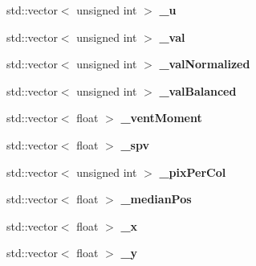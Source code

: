 \begin{DoxyCompactItemize}
\item 
std\+::vector$<$ unsigned int $>$ {\bfseries \+\_\+u}\hypertarget{classLaserData_ab27a18a599b0251dd2ba9654f7939965}{}\label{classLaserData_ab27a18a599b0251dd2ba9654f7939965}

\item 
std\+::vector$<$ unsigned int $>$ {\bfseries \+\_\+val}\hypertarget{classLaserData_ac709774b5b4618312b1400741efb0a1e}{}\label{classLaserData_ac709774b5b4618312b1400741efb0a1e}

\item 
std\+::vector$<$ unsigned int $>$ {\bfseries \+\_\+val\+Normalized}\hypertarget{classLaserData_ae80a6438d10d5f8330b0d9db65bc1f1d}{}\label{classLaserData_ae80a6438d10d5f8330b0d9db65bc1f1d}

\item 
std\+::vector$<$ unsigned int $>$ {\bfseries \+\_\+val\+Balanced}\hypertarget{classLaserData_aafea372e8ff8722dcd21c096047227a9}{}\label{classLaserData_aafea372e8ff8722dcd21c096047227a9}

\item 
std\+::vector$<$ float $>$ {\bfseries \+\_\+vent\+Moment}\hypertarget{classLaserData_a53b20ce99f11333b8a5d73dd5bd0b42e}{}\label{classLaserData_a53b20ce99f11333b8a5d73dd5bd0b42e}

\item 
std\+::vector$<$ float $>$ {\bfseries \+\_\+spv}\hypertarget{classLaserData_abdfa0a1645730ba76e4c2ee308ef4e6e}{}\label{classLaserData_abdfa0a1645730ba76e4c2ee308ef4e6e}

\item 
std\+::vector$<$ unsigned int $>$ {\bfseries \+\_\+pix\+Per\+Col}\hypertarget{classLaserData_aba7ca84cc24a7243498e948c615f3a9e}{}\label{classLaserData_aba7ca84cc24a7243498e948c615f3a9e}

\item 
std\+::vector$<$ float $>$ {\bfseries \+\_\+median\+Pos}\hypertarget{classLaserData_a62be581db140ce0db62e45da39b0d1b1}{}\label{classLaserData_a62be581db140ce0db62e45da39b0d1b1}

\item 
std\+::vector$<$ float $>$ {\bfseries \+\_\+x}\hypertarget{classLaserData_a3311c9d2df2169356639fc64b1ac4670}{}\label{classLaserData_a3311c9d2df2169356639fc64b1ac4670}

\item 
std\+::vector$<$ float $>$ {\bfseries \+\_\+y}\hypertarget{classLaserData_a23b516f406efca6a4f61832a16a2c11a}{}\label{classLaserData_a23b516f406efca6a4f61832a16a2c11a}


\end{DoxyCompactItemize}
